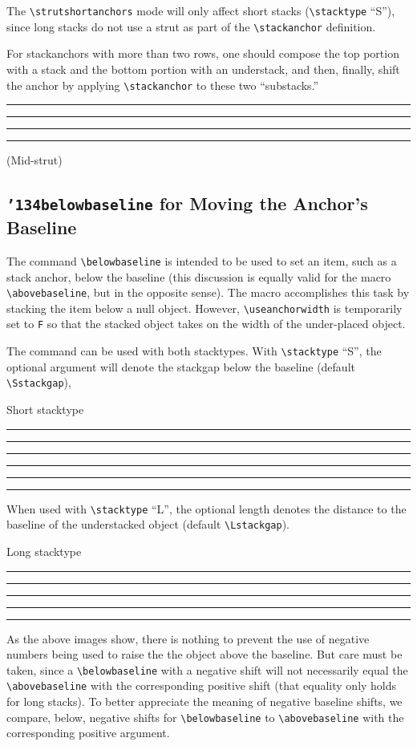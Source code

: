\documentclass{article}
\def\rl{\rule[-.3pt]{2ex}{.6pt}}
\let\vb\verb
\newcommand\cmd[1]{\texttt{\char'134#1}}
\def\blmark{\rl\stackengine{-.9ex}{B}{\rule{.35ex}{0pt}L}{U}{l}{F}{T}{S}\rl}
\begin{document}
The \vb|\strutshortanchors| mode will only affect short stacks
(\vb|\stacktype| ``S''), since long stacks do not use a strut as part
of the \vb|\stackanchor| definition.

For stackanchors with more than two rows, one should compose the top
portion with a stack and the bottom portion with an understack, and
then, finally, shift the anchor by applying \vb|\stackanchor| to these
two ``substacks.''

\Large
{}%
\blmark\rl\rl\rls%
\stackanchor{\upperstack}{\lowerstack}%
\rls(Mid-strut)
\normalsize

\subsection{\cmd{belowbaseline} for Moving the Anchor's
Baseline\label{s:bbl}}

The command \vb|\belowbaseline| is intended to be used to set an item,
such as a stack anchor, below the baseline (this discussion is equally
valid for the macro \vb|\abovebaseline|, but in the opposite sense).
The macro accomplishes this task by stacking the item below a null
object.  However, \vb|\useanchorwidth| is temporarily set to \vb|F| so
that the stacked object takes on the width of the under-placed object.

The command can be used with both stacktypes.  With \vb|\stacktype|
``S'', the optional argument will denote the stackgap below the baseline
(default \vb|\Sstackgap|),

\Large
{}%
\def\stacktype{S}%
Short stacktype\rl\rl{}%
\rl\belowbaseline{\fbox{6pt}}\rl\belowbaseline[-6pt]{\fbox{-6pt}}\rl\rl
\normalsize

When used with \vb|\stacktype| ``L'', the optional length denotes
the distance to the baseline of the understacked object (default
\vb|\Lstackgap|).

\Large
{}%
\def\stacktype{L}%
Long stacktype\rl\rl{}%
\rl\belowbaseline{\fbox{18pt}}\rl\belowbaseline[-19pt]{\fbox{-18pt}}\rl
\normalsize

As the above images show, there is nothing to prevent the use of
negative numbers being used to raise the the object above the baseline.
But care must be taken, since a \vb|\belowbaseline| with a negative
shift will not necessarily equal the \vb|\abovebaseline| with the
corresponding positive shift (that equality only holds for long stacks).
To better appreciate the meaning of negative baseline shifts, we
compare, below, negative shifts for \vb|\belowbaseline| to
\vb|\abovebaseline| with the corresponding positive argument.
\end{document}
